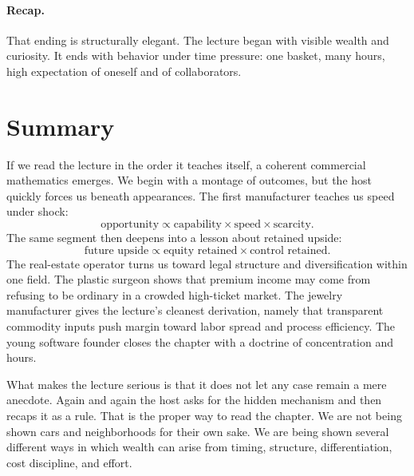 \paragraph{Recap.} That ending is structurally elegant. The lecture began with visible wealth and curiosity. It ends with behavior under time pressure: one basket, many hours, high expectation of oneself and of collaborators.

\section{Summary}

If we read the lecture in the order it teaches itself, a coherent commercial mathematics emerges. We begin with a montage of outcomes, but the host quickly forces us beneath appearances. The first manufacturer teaches us speed under shock:
\[
\text{opportunity} \propto \text{capability}\times \text{speed}\times \text{scarcity}.
\]
The same segment then deepens into a lesson about retained upside:
\[
\text{future upside} \propto \text{equity retained}\times \text{control retained}.
\]
The real-estate operator turns us toward legal structure and diversification within one field. The plastic surgeon shows that premium income may come from refusing to be ordinary in a crowded high-ticket market. The jewelry manufacturer gives the lecture's cleanest derivation, namely that transparent commodity inputs push margin toward labor spread and process efficiency. The young software founder closes the chapter with a doctrine of concentration and hours.

What makes the lecture serious is that it does not let any case remain a mere anecdote. Again and again the host asks for the hidden mechanism and then recaps it as a rule. That is the proper way to read the chapter. We are not being shown cars and neighborhoods for their own sake. We are being shown several different ways in which wealth can arise from timing, structure, differentiation, cost discipline, and effort.